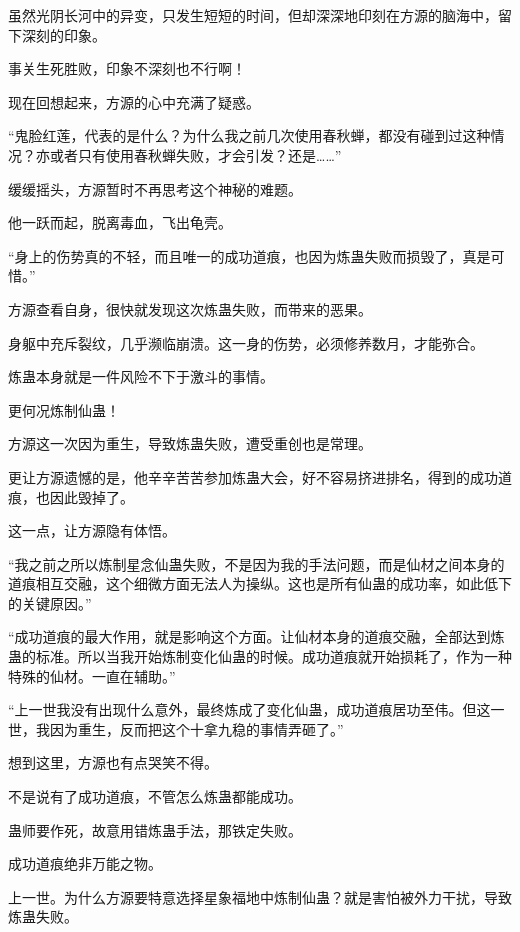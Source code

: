 
\begin{this_body}



虽然光阴长河中的异变，只发生短短的时间，但却深深地印刻在方源的脑海中，留下深刻的印象。

事关生死胜败，印象不深刻也不行啊！

现在回想起来，方源的心中充满了疑惑。

“鬼脸红莲，代表的是什么？为什么我之前几次使用春秋蝉，都没有碰到过这种情况？亦或者只有使用春秋蝉失败，才会引发？还是……”

缓缓摇头，方源暂时不再思考这个神秘的难题。

他一跃而起，脱离毒血，飞出龟壳。

“身上的伤势真的不轻，而且唯一的成功道痕，也因为炼蛊失败而损毁了，真是可惜。”

方源查看自身，很快就发现这次炼蛊失败，而带来的恶果。

身躯中充斥裂纹，几乎濒临崩溃。这一身的伤势，必须修养数月，才能弥合。

炼蛊本身就是一件风险不下于激斗的事情。

更何况炼制仙蛊！

方源这一次因为重生，导致炼蛊失败，遭受重创也是常理。

更让方源遗憾的是，他辛辛苦苦参加炼蛊大会，好不容易挤进排名，得到的成功道痕，也因此毁掉了。

这一点，让方源隐有体悟。

“我之前之所以炼制星念仙蛊失败，不是因为我的手法问题，而是仙材之间本身的道痕相互交融，这个细微方面无法人为操纵。这也是所有仙蛊的成功率，如此低下的关键原因。”

“成功道痕的最大作用，就是影响这个方面。让仙材本身的道痕交融，全部达到炼蛊的标准。所以当我开始炼制变化仙蛊的时候。成功道痕就开始损耗了，作为一种特殊的仙材。一直在辅助。”

“上一世我没有出现什么意外，最终炼成了变化仙蛊，成功道痕居功至伟。但这一世，我因为重生，反而把这个十拿九稳的事情弄砸了。”

想到这里，方源也有点哭笑不得。

不是说有了成功道痕，不管怎么炼蛊都能成功。

蛊师要作死，故意用错炼蛊手法，那铁定失败。

成功道痕绝非万能之物。

上一世。为什么方源要特意选择星象福地中炼制仙蛊？就是害怕被外力干扰，导致炼蛊失败。


\end{this_body}
